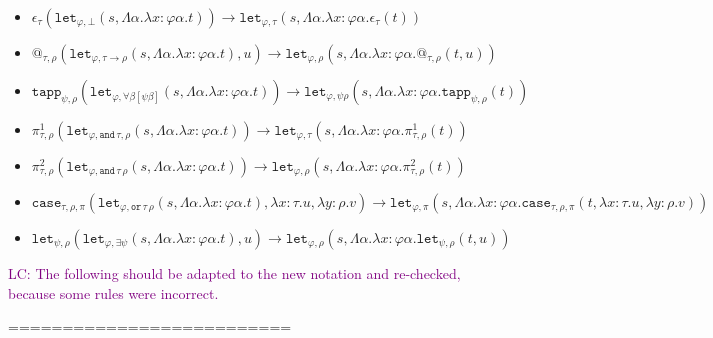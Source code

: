\documentclass[runningheads,a4paper]{llncs}
\newcommand{\red}{\longrightarrow}
\newcommand{\arrtype}{\rightarrow}
\newcommand{\abs}[2]{\lambda #1.#2}
\newcommand{\tabs}[2]{\Lambda #1.#2}
\newcommand{\LC}[1]{\textcolor{purple}{LC: #1}}
\begin{document}
\begin{itemize}
\item
  $\epsilon_\tau(\mathtt{let}_{\varphi,\bot}(s,\tabs{\alpha}{\abs{x:\varphi\alpha}{t}}))
  \red
  \mathtt{let}_{\varphi,\tau}(s,\tabs{\alpha}{\abs{x:\varphi\alpha}{\epsilon_\tau(t)}})$
\item $@_{\tau,\rho}(\mathtt{let}_{\varphi, \tau \arrtype
  \rho}(s,\tabs{\alpha}{\abs{x:\varphi\alpha}{t}}),u) \red
  \mathtt{let}_{\varphi,\rho}(s,\tabs{\alpha}{\abs{x:\varphi\alpha}{@_{\tau,\rho}(t,
      u)}})$
\item
  $\mathtt{tapp}_{\psi,\rho}(\mathtt{let}_{\varphi,\forall\beta[\psi\beta]}(s,\tabs{\alpha}{\abs{x:\varphi\alpha}{t}}))
  \red
  \mathtt{let}_{\varphi,\psi\rho}(s,\tabs{\alpha}{\abs{x:\varphi\alpha}{\mathtt{tapp}_{\psi,\rho}(t)}})$
\item
  $\pi^1_{\tau,\rho}(\mathtt{let}_{\varphi,
  \mathtt{and}\,\tau,\rho}(s,\tabs{\alpha}{\abs{x:\varphi\alpha}{t}}))
  \red
  \mathtt{let}_{\varphi,\tau}(s,\tabs{\alpha}{\abs{x:\varphi\alpha}{\pi^1_{\tau,
        \rho}(t)}})$
\item
  $\pi^2_{\tau,\rho}(\mathtt{let}_{\varphi,
  \mathtt{and}\,\tau\,\rho}(s,\tabs{\alpha}{\abs{x:\varphi\alpha}{t}}))
  \red
  \mathtt{let}_{\varphi,\rho}(s,\tabs{\alpha}{\abs{x:\varphi\alpha}{\pi^2_{\tau,\rho}(t)}})$
\item $\mathtt{case}_{\tau,\rho,\pi}(
  \mathtt{let}_{\varphi,\mathtt{or}\,\tau\,\rho}(s,\tabs{\alpha}{\abs{x:\varphi\alpha}{t}}),\abs{x:\tau}{u},\abs{y:\rho}{v})
  \red
  \mathtt{let}_{\varphi,\pi}(s,\tabs{\alpha}{\abs{x:\varphi\alpha}{\mathtt{case}_{\tau,\rho,\pi}(t,\abs{x:\tau}{u},\abs{y:\rho}{v})}})$
\item
  $\mathtt{let}_{\psi,\rho}(\mathtt{let}_{\varphi,\exists\psi}(s,\tabs{\alpha}{\abs{x:\varphi\alpha}{t}}),u)
  \red
  \mathtt{let}_{\varphi,\rho}(s,\tabs{\alpha}{\abs{x:\varphi\alpha}{\mathtt{let}_{\psi,\rho}(t,u)}})$
\end{itemize}

\LC{The following should be adapted to the new notation and
  re-checked, because some rules were incorrect.}

==========================
\end{document}
